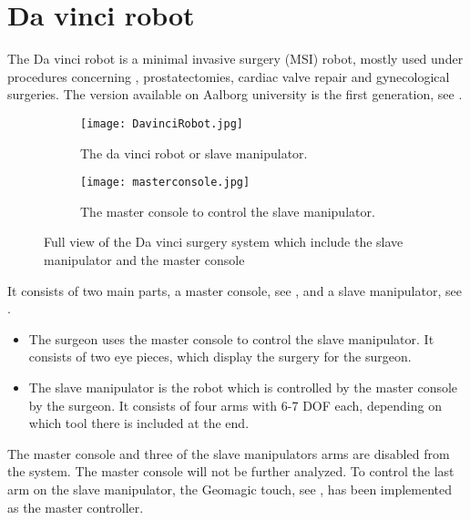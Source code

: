 \section{Da vinci robot}\label{sec:da_vin_rob}

The Da vinci robot is a minimal invasive surgery (MSI) robot, mostly used under procedures concerning , prostatectomies, cardiac valve repair and gynecological surgeries. The version available on Aalborg university is the first generation, see .

\begin{figure}[H]
	\centering
	\begin{subfigure}{.45\textwidth}
		\centering
		\texttt{[image: DavinciRobot.jpg]}
		\caption{The da vinci robot or slave manipulator.}
		\label{fig:davincirobot}
	\end{subfigure}
	\begin{subfigure}{.45\textwidth}
		\centering
		\vspace{12pt}
		\texttt{[image: masterconsole.jpg]}
		\caption{The master console to control the slave manipulator.}
		\label{fig:mastermani}
	\end{subfigure}
\caption{Full view of the Da vinci surgery system which include the slave manipulator and the master console}
\label{fig:fulldavinci}
\end{figure}

It consists of two main parts, a master console, see , and a slave manipulator, see .

\begin{itemize}
\item The surgeon uses the master console to control the slave manipulator. It consists of two eye pieces, which display the surgery for the surgeon. 
\item The slave manipulator is the robot which is controlled by the master console by the surgeon. It consists of four arms with 6-7 \gls{DOF} each, depending on which tool there is included at the end.
\end{itemize}

The master console and three of the slave manipulators arms are disabled from the system. The master console will not be further analyzed. To control the last arm on the slave manipulator, the Geomagic touch, see , has been implemented as the master controller.



